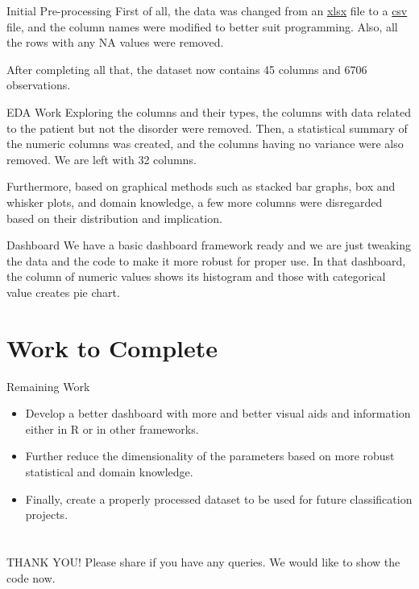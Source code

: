 \documentclass{beamer}
\begin{document}
	\begin{frame}{Initial Pre-processing}
		First of all, the data was changed from an \underline{xlsx} file to a \underline{csv} file, and the column names were modified to better suit programming. Also, all the rows with any NA values were removed.
		
		After completing all that, the dataset now contains 45 columns and 6706 observations.
	\end{frame}
	
	\begin{frame}{EDA Work}
		Exploring the columns and their types, the columns with data related to the patient but not the disorder were removed. Then, a statistical summary of the numeric columns was created, and the columns having no variance were also removed. We are left with 32 columns.
		
		Furthermore, based on graphical methods such as stacked bar graphs, box and whisker plots, and domain knowledge, a few more columns were disregarded based on their distribution and implication.
	\end{frame}
	
	\begin{frame}{Dashboard}
		We have a basic dashboard framework ready and we are just tweaking the data and the code to make it more robust for proper use.\newline
		In that dashboard, the column of numeric values shows its histogram and those with categorical value creates pie chart.
	\end{frame}
	
	\section{Work to Complete}
	\begin{frame}{Remaining Work}
		\begin{itemize}
			\item Develop a better dashboard with more and better visual aids and information either in R or in other frameworks.
			
			\item Further reduce the dimensionality of the parameters based on more robust statistical and domain knowledge.
			
			\item Finally, create a properly processed dataset to be used for future classification projects.
		\end{itemize}
	\end{frame}
	
	
	\section*{}
	\begin{frame}
		\begin{center}
			{\Huge THANK YOU!} \newline \newline
		Please share if you have any queries.\newline \newline
		We would like to show the code now.
		
	\end{center}
	\end{frame}
	
\end{document}
